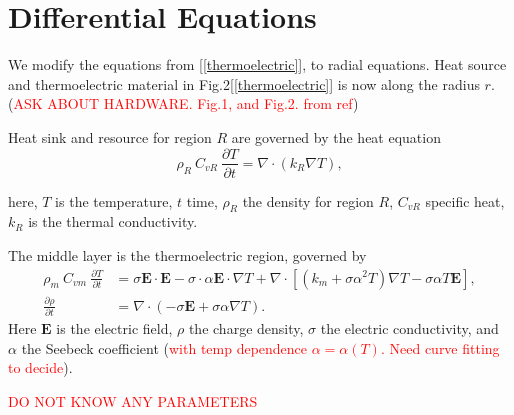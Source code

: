 \documentclass[12pt]{article}
\newcommand\bE{{\mathbf E}}
\begin{document}
\section{Differential Equations}



We modify the equations from [\ref{thermoelectric}], to radial equations.
Heat source and thermoelectric material in Fig.2[\ref{thermoelectric}] is now along the radius $r$. (\textcolor{red}{ASK ABOUT HARDWARE. Fig.1, and Fig.2. from ref})

Heat sink and resource for region $R$ are governed by the heat equation
\begin{equation}
\rho_R\ C_{vR}\ \frac{\partial T}{\partial t}=\nabla\cdot (k_R\nabla T),\label{heat}
\end{equation}

here, $T$ is the temperature, $t$ time, $\rho_R$ the density for region $R$, $C_{vR}$ specific heat, $k_R$ is the thermal conductivity. 

The middle layer is the thermoelectric region, governed by 
\begin{align}
\rho_{m}\ C_{vm}\ \frac{\partial T}{\partial t}&=\sigma\bE\cdot\bE-\sigma\cdot \alpha\bE\cdot \nabla T+\nabla\cdot[(k_m+\sigma\alpha^2T)\nabla T-\sigma\alpha T\bE],\label{elec}\\
\frac{\partial \rho}{\partial t}&=\nabla\cdot (-\sigma\bE+\sigma\alpha\nabla T).\label{chargedensity}
\end{align}
Here $\bE$ is the electric field, $\rho$ the charge density, $\sigma$ the electric conductivity, and $\alpha$ the Seebeck coefficient (\textcolor{red}{with temp dependence $\alpha=\alpha(T)$. Need curve fitting to decide}). 

\textcolor{red}{DO NOT KNOW ANY PARAMETERS}
\end{document}
